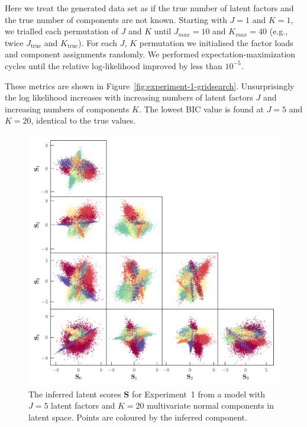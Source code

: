\documentclass[twocolumn]{aastex62}
\newcommand{\factorscores}{\textbf{S}}
\newcommand{\NumLatentFactors}{J}
\newcommand{\NumComponents}{K}
\begin{document}
Here we treat the generated data set as if the true number of latent factors
and the true number of components are not known. Starting with $\NumLatentFactors = 1$
and $\NumComponents = 1$, we trialled each permutation of $\NumLatentFactors$ and $\NumComponents$
until $\NumLatentFactors_{max} = 10$
and   $\NumComponents_{max} = 40$ (e.g., twice $\NumLatentFactors_\textrm{true}$ and $\NumComponents_\textrm{true}$).
For each $\NumLatentFactors$, $\NumComponents$ permutation we initialised the factor
loads and component assignments randomly. We performed expectation-maximization 
cycles until the relative log-likelihood improved by less than $10^{-5}$. 



These metrics are shown in Figure~\ref{fig:experiment-1-gridsearch}.
Unsurprisingly the log likelihood increases with increasing numbers of latent
factors $\NumLatentFactors$ and increasing numbers of components $\NumComponents$.
The lowest BIC value is found at $\NumLatentFactors = 5$
and $\NumComponents = 20$, identical to the true values.

\begin{figure}
	\includegraphics[width=\textwidth]{experiments/exp1-latent.pdf}
    \caption{The inferred latent scores $\factorscores$ for Experiment~1
    		 from a model with $\NumLatentFactors = 5$ latent factors and
		 	 $\NumComponents = 20$ multivariate normal components in
			 latent space.
             Points are coloured by the inferred component.}
    \label{fig:exp1-latent}
\end{figure}
\end{document}
